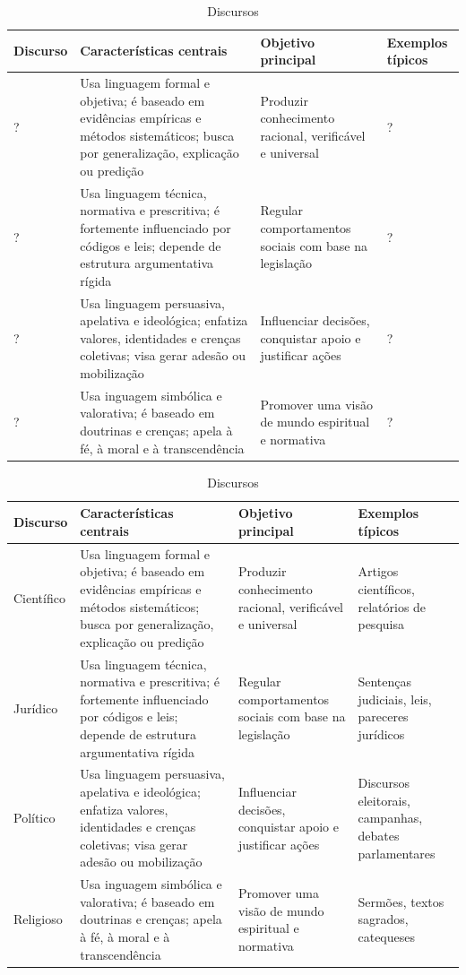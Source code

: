 \documentclass[
]{book}
\begin{document}
\begin{table}

\caption{\label{tab:unnamed-chunk-2}Discursos}
\centering
\begin{tabular}[t]{l|l|l|l}
\hline
Discurso & Características centrais & Objetivo principal & Exemplos típicos\\
\hline
? & Usa linguagem formal e objetiva; é baseado em evidências empíricas e métodos sistemáticos; busca por generalização, explicação ou predição & Produzir conhecimento racional, verificável e universal & ?\\
\hline
? & Usa linguagem técnica, normativa e prescritiva; é fortemente influenciado por códigos e leis; depende de estrutura argumentativa rígida & Regular comportamentos sociais com base na legislação & ?\\
\hline
? & Usa linguagem persuasiva, apelativa e ideológica; enfatiza valores, identidades e crenças coletivas; visa gerar adesão ou mobilização & Influenciar decisões, conquistar apoio e justificar ações & ?\\
\hline
? & Usa inguagem simbólica e valorativa; é baseado em doutrinas e crenças; apela à fé, à moral e à transcendência & Promover uma visão de mundo espiritual e normativa & ?\\
\hline
\end{tabular}
\end{table}

\begin{table}

\caption{\label{tab:unnamed-chunk-3}Discursos}
\centering
\begin{tabular}[t]{l|l|l|l}
\hline
Discurso & Características centrais & Objetivo principal & Exemplos típicos\\
\hline
Científico & Usa linguagem formal e objetiva; é baseado em evidências empíricas e métodos sistemáticos; busca por generalização, explicação ou predição & Produzir conhecimento racional, verificável e universal & Artigos científicos, relatórios de pesquisa\\
\hline
Jurídico & Usa linguagem técnica, normativa e prescritiva; é fortemente influenciado por códigos e leis; depende de estrutura argumentativa rígida & Regular comportamentos sociais com base na legislação & Sentenças judiciais, leis, pareceres jurídicos\\
\hline
Político & Usa linguagem persuasiva, apelativa e ideológica; enfatiza valores, identidades e crenças coletivas; visa gerar adesão ou mobilização & Influenciar decisões, conquistar apoio e justificar ações & Discursos eleitorais, campanhas, debates parlamentares\\
\hline
Religioso & Usa inguagem simbólica e valorativa; é baseado em doutrinas e crenças; apela à fé, à moral e à transcendência & Promover uma visão de mundo espiritual e normativa & Sermões, textos sagrados, catequeses\\
\hline
\end{tabular}
\end{table}
\end{document}
